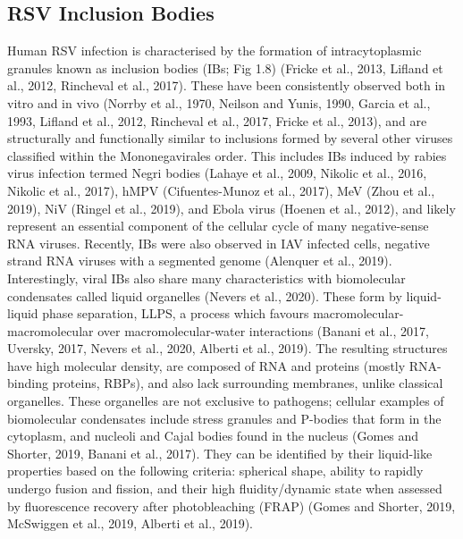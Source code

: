 \subsection{RSV Inclusion Bodies} \label{subsec:RSV Inclusion Bodies}













Human RSV infection is characterised by the formation of intracytoplasmic granules known as inclusion bodies (IBs; Fig 1.8) (Fricke et al., 2013, Lifland et al., 2012, Rincheval et al., 2017). These have been consistently observed both in vitro and in vivo (Norrby et al., 1970, Neilson and Yunis, 1990, Garcia et al., 1993, Lifland et al., 2012, Rincheval et al., 2017, Fricke et al., 2013), and are structurally and functionally similar to inclusions formed by several other viruses classified within the Mononegavirales order. This includes IBs induced by rabies virus infection termed Negri bodies (Lahaye et al., 2009, Nikolic et al., 2016, Nikolic et al., 2017), hMPV (Cifuentes-Munoz et al., 2017), MeV (Zhou et al., 2019), NiV (Ringel et al., 2019), and Ebola virus (Hoenen et al., 2012), and likely represent an essential component of the cellular cycle of many negative-sense RNA viruses. Recently, IBs were also observed in IAV infected cells, negative strand RNA viruses with a segmented genome (Alenquer et al., 2019). Interestingly, viral IBs also share many characteristics with biomolecular condensates called liquid organelles (Nevers et al., 2020). These form by liquid-liquid phase separation, LLPS, a process which favours macromolecular-macromolecular over macromolecular-water interactions (Banani et al., 2017, Uversky, 2017, Nevers et al., 2020, Alberti et al., 2019). The resulting structures have high molecular density, are composed of RNA and proteins (mostly RNA-binding proteins, RBPs), and also lack surrounding membranes, unlike classical organelles. These organelles are not exclusive to pathogens; cellular examples of biomolecular condensates include stress granules and P-bodies that form in the cytoplasm, and nucleoli and Cajal bodies found in the nucleus (Gomes and Shorter, 2019, Banani et al., 2017). They can be identified by their liquid-like properties based on the following criteria: spherical shape, ability to rapidly undergo fusion and fission, and their high fluidity/dynamic state when assessed by fluorescence recovery after photobleaching (FRAP) (Gomes and Shorter, 2019, McSwiggen et al., 2019, Alberti et al., 2019).



